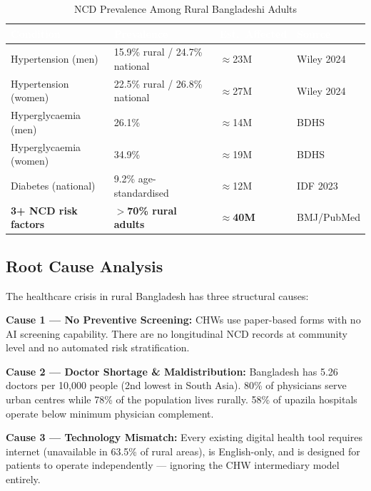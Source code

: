 \documentclass[12pt, a4paper]{article}
\begin{document}
\begin{table}[H]
\centering
\caption{NCD Prevalence Among Rural Bangladeshi Adults}
\small
\begin{tabularx}{\linewidth}{@{}lXXl@{}}
\toprule
\rowcolor{navycolor}
\textcolor{white}{\textbf{Condition}} &
\textcolor{white}{\textbf{Prevalence}} &
\textcolor{white}{\textbf{Est.\ Affected}} &
\textcolor{white}{\textbf{Source}} \\
\midrule
Hypertension (men)     & 15.9\% rural / 24.7\% national & $\approx$23M & Wiley 2024 \\
\rowcolor{gray10}
Hypertension (women)   & 22.5\% rural / 26.8\% national & $\approx$27M & Wiley 2024 \\
Hyperglycaemia (men)   & 26.1\%                          & $\approx$14M & BDHS \\
\rowcolor{gray10}
Hyperglycaemia (women) & 34.9\%                          & $\approx$19M & BDHS \\
Diabetes (national)    & 9.2\% age-standardised          & $\approx$12M & IDF 2023 \\
\rowcolor{gray10}
\textbf{3+ NCD risk factors} & \textbf{$>$70\% rural adults} & \textbf{$\approx$40M} & BMJ/PubMed \\
\bottomrule
\end{tabularx}
\end{table}

\subsection{Root Cause Analysis}

The healthcare crisis in rural Bangladesh has three structural causes:

\medskip
\noindent
\begin{tcolorbox}[
  enhanced, arc=3pt, boxrule=0.6pt,
  colback=gray10, colframe=gray30,
  top=10pt, bottom=10pt, left=14pt, right=14pt
]
\small
\textbf{\textcolor{riskred}{Cause 1 — No Preventive Screening:}} CHWs use paper-based forms with no
AI screening capability. There are no longitudinal NCD records at community level and no
automated risk stratification.

\medskip
\textbf{\textcolor{riskred}{Cause 2 — Doctor Shortage \& Maldistribution:}} Bangladesh has 5.26
doctors per 10,000 people (2nd lowest in South Asia). 80\% of physicians serve urban centres
while 78\% of the population lives rurally. 58\% of upazila hospitals operate below minimum
physician complement.

\medskip
\textbf{\textcolor{riskred}{Cause 3 — Technology Mismatch:}} Every existing digital health tool
requires internet (unavailable in 63.5\% of rural areas), is English-only, and is designed for
patients to operate independently — ignoring the CHW intermediary model entirely.
\end{tcolorbox}
\end{document}
